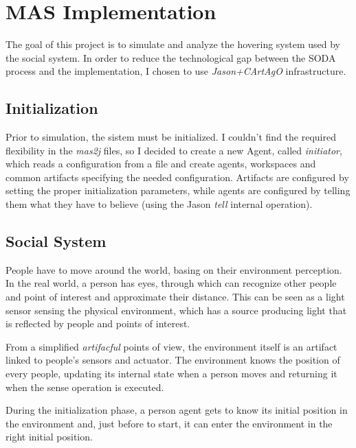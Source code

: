 \section{MAS Implementation}

The goal of this project is to simulate and analyze the
hovering system used by the social system. In order to
reduce the technological gap between the SODA process and
the implementation, I chosen to use \emph{Jason+CArtAgO}
infrastructure.

\subsection{Initialization}
Prior to simulation, the sistem must be initialized. I couldn't find the
required flexibility in the \emph{mas2j} files, so I decided to create a new
Agent, called \emph{initiator}, which reads a configuration from a file and
create agents, workspaces and common artifacts specifying the needed configuration.
Artifacts are configured by setting the proper initialization parameters, while
agents are configured by telling them what they have to believe (using the
Jason \emph{tell} internal operation).

\subsection{Social System}
People have to move around the world, basing on
their environment perception. In the real world,
a person has eyes, through which can recognize other
people and point of interest and approximate their distance.
This can be seen as a light sensor sensing the
physical environment, which has a source producing light
that is reflected by people and points of interest.

From a simplified \emph{artifacful} points of view, the
environment itself is an artifact linked to people's
sensors and actuator. The environment knows the position of
every people, updating its internal state when a person moves
and returning it when the sense operation is executed.

During the initialization phase, a person agent gets to know
its initial position in the environment and, just before to start,
it can enter the environment in the right initial position.
